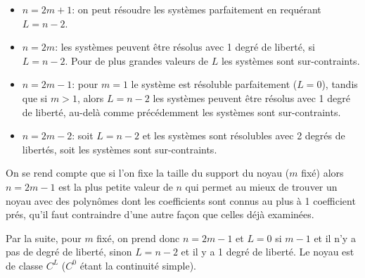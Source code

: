 \documentclass[11pt,twoside]{article}
\newcommand{\itemb}{\item[$\bullet$]}
\begin{document}
\begin{itemize}
\itemb $n=2m+1$: on peut résoudre les systèmes parfaitement en requérant $L=n-2$.
\itemb $n=2m$: les systèmes peuvent être résolus avec 1 degré de liberté, si $L=n-2$. Pour de plus grandes valeurs de $L$ les systèmes sont sur-contraints.
\itemb $n=2m-1$: pour $m=1$ le système est résoluble parfaitement ($L=0$), tandis que si $m>1$, alors $L=n-2$ les systèmes peuvent être résolus avec 1 degré de liberté, au-delà comme précédemment les systèmes sont sur-contraints.
\itemb $n=2m-2$: soit $L=n-2$ et les systèmes sont résolubles avec 2 degrés de libertés, soit les systèmes sont sur-contraints. 
\end{itemize}
On se rend compte que si l'on fixe la taille du support du noyau ($m$ fixé) alors $n=2m-1$ est la plus petite valeur de $n$ qui permet au mieux de trouver un noyau avec des polynômes dont les coefficients sont connus au plus à 1 coefficient prés, qu'il faut contraindre d'une autre façon que celles déjà examinées. 

Par la suite, pour $m$ fixé, on prend donc $n=2m-1$ et $L=0$ si $m-1$ et il n'y a pas de degré de liberté, sinon $L=n-2$ et il y a 1 degré de liberté. Le noyau est de classe $C^L$ ($C^0$ étant la continuité simple).   
\end{document}
